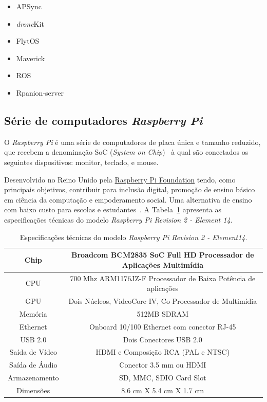 \documentclass[12pt,a4paper,oneside]{book}
\begin{document}
\begin{itemize}
  \item APSync
  \item \textit{drone}Kit
  \item FlytOS
  \item Maverick
  \item ROS
  \item Rpanion-server
\end{itemize}


\subsection {Série de computadores \textit{Raspberry Pi}}
%
O \textit{Raspberry Pi} é uma série de computadores de placa única e tamanho reduzido, que recebem a denominação  SoC (\textit{System on Chip})~\cite{url:soc} à qual são conectados os seguintes dispositivos: monitor, teclado, e mouse. 

Desenvolvido no Reino Unido pela \href{https://www.raspberrypi.org/}{Raspberry Pi Foundation} tendo, como principais objetivos, contribuir para inclusão digital, promoção de ensino básico em ciência da computação e empoderamento social. Uma alternativa de ensino com baixo custo para escolas e estudantes~\cite{url:raspberry_wiki}. A Tabela~\ref{tab:Especificacoes} apresenta as especificações técnicas do modelo \textit{Raspberry Pi Revision 2 - Element 14}.
%
\begin{table}[!htbp]
    \centering
    \begin{tabular}{ |c|c| } 
        \hline
        Chip & Broadcom BCM2835 SoC Full HD Processador de Aplicações Multimídia\\
        \hline
        CPU & 700 Mhz ARM1176JZ-F Processador de Baixa Potência de aplicações \\
        \hline
        GPU & Dois Núcleos, VideoCore IV, Co-Processador de Multimídia \\ 
        \hline
        Memória & 512MB SDRAM  \\
        \hline
        Ethernet & Onboard 10/100 Ethernet com conector RJ-45 \\
        \hline
        USB 2.0 & Dois Conectores USB 2.0 \\ 
        \hline
        Saída de Vídeo & HDMI e Composição RCA (PAL e NTSC) \\ 
        \hline
        Saída de Áudio & Conector 3.5 mm ou HDMI \\
        \hline
        Armazenamento & SD, MMC, SDIO Card Slot \\
        \hline
        Dimensões & 8.6 cm X 5.4 cm X 1.7 cm \\ 
        \hline
    \end{tabular}
    \caption{Especificações técnicas do modelo \textit{Raspberry Pi Revision 2 - Element14}.}
    \label{tab:Especificacoes}
\end{table}
\end{document}
